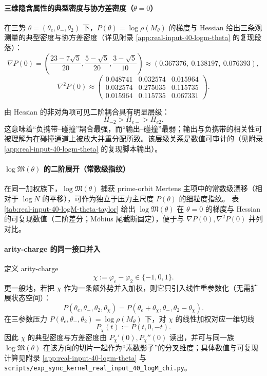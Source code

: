 \paragraph{三维隐含属性的典型密度与协方差密度（\texorpdfstring{$\theta=0$}{theta=0}）}
在三势 $\theta=(\theta_e,\theta_-,\theta_2)$ 下，$P(\theta)=\log\rho(M_\theta)$ 的梯度与 Hessian 给出三条观测量的典型密度与协方差密度（详见附录 \ref{app:real-input-40-logm-theta} 的复现段落）：
\[
\nabla P(0)=\left(\frac{23-7\sqrt5}{20},\frac{5-\sqrt5}{20},\frac{3-\sqrt5}{10}\right)\approx(0.367376,\ 0.138197,\ 0.076393),
\]
\[
\nabla^2P(0)\approx
\begin{pmatrix}
0.048741 & 0.032574 & 0.015964\\
0.032574 & 0.275035 & 0.115735\\
0.015964 & 0.115735 & 0.067331
\end{pmatrix}.
\]
\begin{remark}
由 Hessian 的非对角项可见二阶耦合具有明显层级：
\[
H_{-2}>H_{e-}>H_{e2}.
\]
这意味着“负携带--碰撞”耦合最强，而“输出--碰撞”最弱；输出与负携带的相关性可被理解为在碰撞通道上被放大并重分配所致。该层级关系是数值可审计的（见附录 \ref{app:real-input-40-logm-theta} 的复现脚本输出）。
\end{remark}

\paragraph{\texorpdfstring{$\log\mathfrak{M}(\theta)$}{logM(theta)} 的二阶展开（常数级指纹）}
在同一加权族下，$\log\mathfrak{M}(\theta)$ 捕获 prime-orbit Mertens 主项中的常数级漂移（相对于 $\log N$ 的平移），可作为独立于压力主尺度 $P(\theta)$ 的细粒度指纹。
表 \ref{tab:real-input-40-logM-theta-taylor} 给出 $\log\mathfrak{M}(\theta)$ 在 $\theta=0$ 的梯度与 Hessian 的可复现数值（二阶差分；Möbius 尾截断固定），便于与 $\nabla P(0),\nabla^2P(0)$ 并列对比。


\paragraph{arity-charge 的同一接口并入}
定义 arity-charge
\[
\chi:=\varphi_e-\varphi_2\in\{-1,0,1\}.
\]
更一般地，若把 $\chi$ 作为一条额外势并入加权，则它只引入线性重参数化（无需扩展状态空间）：
\[
P(\theta_e,\theta_-,\theta_2,\theta_\chi)=P(\theta_e+\theta_\chi,\theta_-,\theta_2-\theta_\chi).
\]
在三参数压力 $P(\theta_e,\theta_-,\theta_2)=\log\rho(M_\theta)$ 下，对 $\chi$ 的线性加权对应一维切线
\[
P_\chi(t):=P(t,0,-t).
\]
因此 $\chi$ 的典型密度与方差密度由
\(
P_\chi'(0),P_\chi''(0)
\)
读出，并可与同一族 $\log\mathfrak{M}(\theta)$ 在该方向的切片一起作为“素数影子”的分叉维度；具体数值与可复现计算见附录 \ref{app:real-input-40-logm-theta} 与
\texttt{scripts/exp\_sync\_kernel\_real\_input\_40\_logM\_chi.py}。

